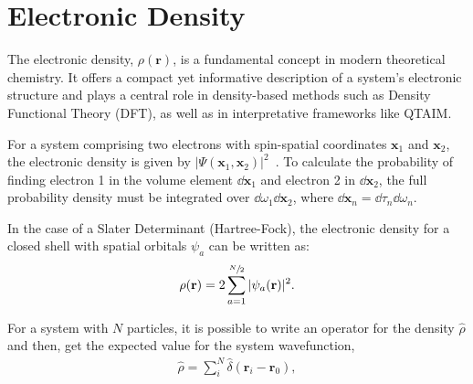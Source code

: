 \newpage
\section{Electronic Density}\label{densidades}

The electronic density, $\rho(\mathbf{r})$, is a fundamental concept in modern
theoretical chemistry. It offers a compact yet informative description of a
system's electronic structure and plays a central role in density-based methods
such as Density Functional Theory (DFT), as well as in interpretative
frameworks like QTAIM.

For a system comprising two electrons with spin-spatial coordinates
$\mathbf{x}_1$ and $\mathbf{x}_2$, the electronic density is given by
$|\Psi(\mathbf{x}_1, \mathbf{x}_2)|^2$~\cite{RobertG1994}.  To calculate the
probability of finding electron 1 in the volume element $\dd\mathbf{x}_1$ and
electron 2 in $\dd\mathbf{x}_2$, the full probability density must be
integrated over $\dd\omega_1 \dd\mathbf{x}_2$, where $\dd\mathbf{x}_n =
\dd\tau_n \dd\omega_n$.


In the case of a Slater Determinant (Hartree-Fock), the electronic density for
a closed shell with spatial orbitals ${\psi_a}$ can be written as:
%
\begin{align}
  \rho (\mathbf{r}) = 2 \sum_{a=1}^{\sfrac{N}{2}} |\psi_a (\mathbf{r})|^2 .
\end{align}

\newpage
For a system with $N$ particles, it is possible to write an operator for the
density $\hat{\rho}$ and then, get the expected value for the system
wavefunction,
%
\begin{align}
  \hat{\rho} = \sum_i^N \hat{\delta} (\mathbf{r}_i - \mathbf{r}_0),
\end{align}

